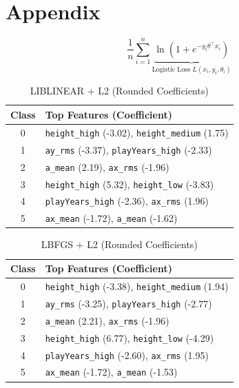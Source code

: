 \documentclass[10pt,twocolumn]{article}
\begin{document}
\printbibliography

\appendix
\section*{Appendix}



\begin{equation}{\dfrac 1 n} \sum^n_{i=1}  \underbrace{\ln ({1+e^{-y_i \theta^\top x_i}})}_{\text{Logistic Loss \ } L(x_i, y_i, \theta_i)}\label{eq:logistic-loss}
\end{equation}

\begin{table}[H]
\centering
\footnotesize
\caption{LIBLINEAR + L2 (Rounded Coefficients)}
\begin{tabular}{|c|p{6.5cm}|}
\hline
\textbf{Class} & \textbf{Top Features (Coefficient)} \\
\hline
0 & \texttt{height\_high} (-3.02), \texttt{height\_medium} (1.75) \\
1 & \texttt{ay\_rms} (-3.37), \texttt{playYears\_high} (-2.33) \\
2 & \texttt{a\_mean} (2.19), \texttt{ax\_rms} (-1.96) \\
3 & \texttt{height\_high} (5.32), \texttt{height\_low} (-3.83) \\
4 & \texttt{playYears\_high} (-2.36), \texttt{ax\_rms} (1.96) \\
5 & \texttt{ax\_mean} (-1.72), \texttt{a\_mean} (-1.62) \\
\hline
\end{tabular}
\label{tab:logreg-liblinear-l2}
\end{table}

\begin{table}[H]
\centering
\footnotesize
\caption{LBFGS + L2 (Rounded Coefficients)}
\begin{tabular}{|c|p{6.5cm}|}
\hline
\textbf{Class} & \textbf{Top Features (Coefficient)} \\
\hline
0 & \texttt{height\_high} (-3.38), \texttt{height\_medium} (1.94) \\
1 & \texttt{ay\_rms} (-3.25), \texttt{playYears\_high} (-2.77) \\
2 & \texttt{a\_mean} (2.21), \texttt{ax\_rms} (-1.96) \\
3 & \texttt{height\_high} (6.77), \texttt{height\_low} (-4.29) \\
4 & \texttt{playYears\_high} (-2.60), \texttt{ax\_rms} (1.95) \\
5 & \texttt{ax\_mean} (-1.72), \texttt{a\_mean} (-1.53) \\
\hline
\end{tabular}
\label{tab:logreg-lbfgs-l2}
\end{table}
\end{document}
